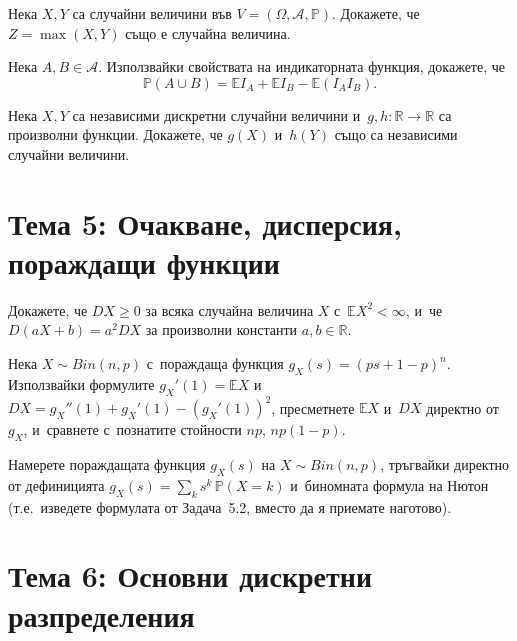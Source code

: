 \begin{probbox}[Задача 4.1]
Нека $X,Y$ са случайни величини във $V=(\Omega,\mathcal A,\mathbb
P)$. Докажете, че $Z=\max(X,Y)$ също е случайна величина.
\end{probbox}

\begin{probbox}[Задача 4.2]
Нека $A,B\in\mathcal A$. Използвайки свойствата на индикаторната
функция, докажете, че
\[
  \mathbb P(A\cup B) = \mathbb E I_A + \mathbb E I_B - \mathbb E(I_A I_B).
\]
\end{probbox}

\begin{probbox}[Задача 4.3]
Нека $X,Y$ са независими дискретни случайни величини и~$g,h:\mathbb
R\to\mathbb R$ са произволни функции. Докажете, че $g(X)$ и~$h(Y)$
също са независими случайни величини.
\end{probbox}

\section*{Тема 5: Очакване, дисперсия, пораждащи функции}

\begin{probbox}[Задача 5.1]
Докажете, че $DX\ge0$ за всяка случайна величина $X$ с~$\mathbb
EX^2<\infty$, и~че $D(aX+b)=a^2DX$ за произволни константи
$a,b\in\mathbb R$.
\end{probbox}

\begin{probbox}[Задача 5.2]
Нека $X\sim Bin(n,p)$ с~пораждаща функция $g_X(s)=(ps+1-p)^n$.
Използвайки формулите $g_X'(1)=\mathbb EX$ и~$DX=g_X''(1)+g_X'(1)-
(g_X'(1))^2$, пресметнете $\mathbb EX$ и~$DX$ директно от $g_X$, и~сравнете с~познатите стойности $np$, $np(1-p)$.
\end{probbox}

\begin{probbox}[Задача 5.3]
Намерете пораждащата функция $g_X(s)$ на $X\sim Bin(n,p)$, тръгвайки
директно от дефиницията $g_X(s)=\sum_k s^k\,\mathbb P(X=k)$ и~биномната формула на Нютон (т.е.\ изведете формулата от Задача~5.2,
вместо да я приемате наготово).
\end{probbox}

\section*{Тема 6: Основни дискретни разпределения}

